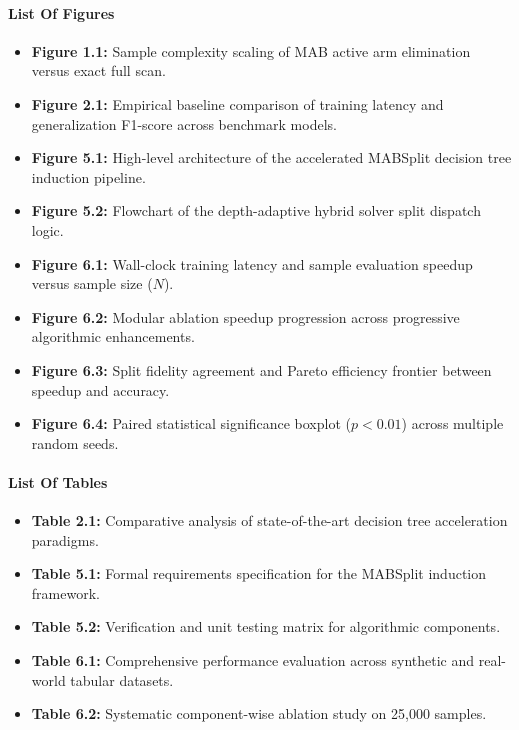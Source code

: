 \documentclass{article}
\begin{document}
	\paragraph{\Large \textbf{List Of Figures}}\nopagebreak
	\begin{itemize}
		\item \textbf{Figure 1.1:} Sample complexity scaling of MAB active arm elimination versus exact full scan.
		\item \textbf{Figure 2.1:} Empirical baseline comparison of training latency and generalization F1-score across benchmark models.
		\item \textbf{Figure 5.1:} High-level architecture of the accelerated MABSplit decision tree induction pipeline.
		\item \textbf{Figure 5.2:} Flowchart of the depth-adaptive hybrid solver split dispatch logic.
		\item \textbf{Figure 6.1:} Wall-clock training latency and sample evaluation speedup versus sample size ($N$).
		\item \textbf{Figure 6.2:} Modular ablation speedup progression across progressive algorithmic enhancements.
		\item \textbf{Figure 6.3:} Split fidelity agreement and Pareto efficiency frontier between speedup and accuracy.
		\item \textbf{Figure 6.4:} Paired statistical significance boxplot ($p < 0.01$) across multiple random seeds.
	\end{itemize}

	\vspace{0.8cm}
	\paragraph{\Large \textbf{List Of Tables}}\nopagebreak
	\begin{itemize}
		\item \textbf{Table 2.1:} Comparative analysis of state-of-the-art decision tree acceleration paradigms.
		\item \textbf{Table 5.1:} Formal requirements specification for the MABSplit induction framework.
		\item \textbf{Table 5.2:} Verification and unit testing matrix for algorithmic components.
		\item \textbf{Table 6.1:} Comprehensive performance evaluation across synthetic and real-world tabular datasets.
		\item \textbf{Table 6.2:} Systematic component-wise ablation study on 25,000 samples.
	\end{itemize}
\end{document}
